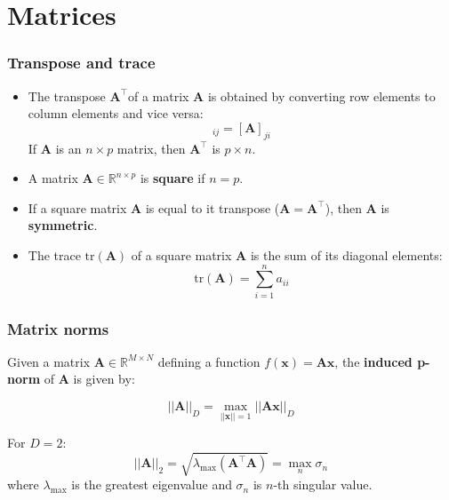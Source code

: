 \documentclass[smaller]{beamer}
\newcommand{\?}{\stackrel{?}{=}}
\newcommand{\la}{\lambda}
\newcommand{\si}{\sigma}
\newcommand{\mb}{\mathbb}
\newcommand{\tr}{^{\top}}
\begin{document}
\section{Matrices}
\begin{frame}
	\frametitle{Transpose and trace}
	\pause
	\begin{itemize}
		\pause
		
		\item The transpose $\bm A\tr$of a matrix $\bm A$ is obtained by
		converting row elements to column elements and vice versa: \pause
		\begin{equation}
			[\bm A\tr]_{ij} = [\bm A]_{ji}
		\end{equation}
		\pause
		If $\bm A$ is an $n\times p$ matrix, then $\bm A\tr$ is $p \times n$.
		\pause
		
		\item A matrix $\bm A\in\mb{R}^{n\times p}$ is \textbf{square} if $n=p$.
		
		\pause 
		
		\item If a square matrix $\bm A$ is equal to it transpose ($\bm A =
		\bm A\tr$), then $\bm A$ is \textbf{symmetric}.
		
		\item The trace $\text{tr}(\bm A)$ of a square matrix $\bm A$ is the sum of its diagonal elements:\pause
		\begin{equation}
			\text{tr}(\bm A) = \sum_{i=1}^{n}a_{ii}
		\end{equation}
		
	\end{itemize}
\end{frame}

\begin{frame}
  \frametitle{Matrix norms}
  \pause
  Given a matrix $\bm A\in\mb{R}^{M\times N}$ defining a function
  $f(\bm x) = \bm A\bm x$, the \textbf{induced p-norm} of $\bm A$ is
  given by:\pause

  \begin{equation}
    ||\bm A||_D = \max_{||\bm x||=1}||\bm A\bm x||_D
  \end{equation}

  \pause

  For $D=2$:\pause
  \begin{equation}
    ||\bm A||_2 = \sqrt{\la_{\max}(\bm A\tr\bm A) } = \max_n\si_n
  \end{equation}
  \pause
  where $\la_{\max}$ is the greatest eigenvalue and $\si_n$ is $n$-th
  singular value.

\end{frame}
\end{document}
